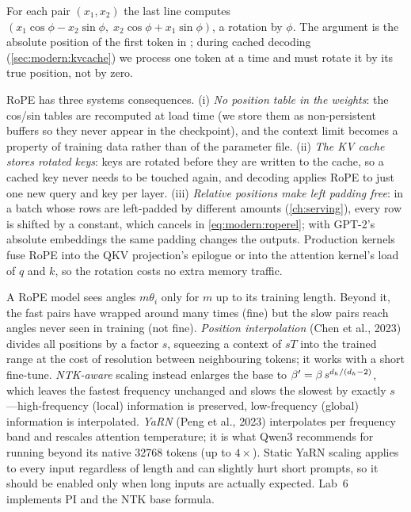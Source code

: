 For each pair $(x_1,x_2)$ the last line computes $(x_1\cos\phi - x_2\sin\phi,\; x_2\cos\phi+x_1\sin\phi)$,
a rotation by $\phi$. The  argument is the absolute position of the first token in
; during cached decoding (\cref{sec:modern:kvcache}) we process one token at a time and must
rotate it by its true position, not by zero.

\begin{systemslens}
RoPE has three systems consequences. (i) \emph{No position table in the weights}: the cos/sin tables
are recomputed at load time (we store them as non-persistent buffers so they never appear in the
checkpoint), and the context limit becomes a property of training data rather than of the
parameter file. (ii) \emph{The KV cache stores rotated keys}: keys are rotated before they are
written to the cache, so a cached key never needs to be touched again, and decoding applies RoPE to
just one new query and key per layer. (iii) \emph{Relative positions make left padding free}: in a
batch whose rows are left-padded by different amounts (\cref{ch:serving}), every row is shifted by a
constant, which cancels in \cref{eq:modern:roperel}; with GPT-2's absolute embeddings the same
padding changes the outputs. Production kernels fuse RoPE into the QKV projection's epilogue or into
the attention kernel's load of $q$ and $k$, so the rotation costs no extra memory traffic.
\end{systemslens}

\begin{deepdive}
A RoPE model sees angles $m\theta_i$ only for $m$ up to its training length. Beyond it, the
fast pairs have wrapped around many times (fine) but the slow pairs reach angles never seen in
training (not fine). \emph{Position interpolation} (Chen et al., 2023) divides all positions by a
factor $s$, squeezing a context of $sT$ into the trained range at the cost of resolution between
neighbouring tokens; it works with a short fine-tune. \emph{NTK-aware} scaling instead enlarges the
base to $\beta' = \beta\, s^{d_{h}/(d_{h}-2)}$, which leaves the fastest frequency unchanged and slows
the slowest by exactly $s$---high-frequency (local) information is preserved, low-frequency (global)
information is interpolated. \emph{YaRN} (Peng et al., 2023) interpolates per frequency band and
rescales attention temperature; it is what Qwen3 recommends for running beyond its native
\num{32768} tokens (up to $4\times$). Static YaRN scaling applies to every input regardless of length
and can slightly hurt short prompts, so it should be enabled only when long inputs are actually
expected. Lab~6 implements PI and the NTK base formula.
\end{deepdive}

